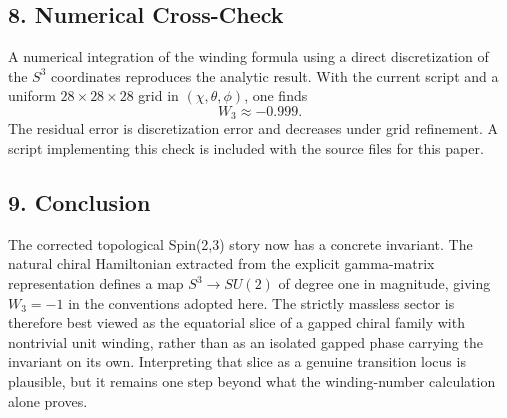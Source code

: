 \documentclass[
]{article}
\begin{document}
\subsection{8. Numerical Cross-Check}\label{numerical-cross-check}

A numerical integration of the winding formula using a direct
discretization of the \(S^3\) coordinates reproduces the analytic
result. With the current script and a uniform \(28 \times 28 \times 28\)
grid in \((\chi,\theta,\phi)\), one finds \[
W_3 \approx -0.999.
\] The residual error is discretization error and decreases under grid
refinement. A script implementing this check is included with the source
files for this paper.

\subsection{9. Conclusion}\label{conclusion}

The corrected topological Spin(2,3) story now has a concrete invariant.
The natural chiral Hamiltonian extracted from the explicit gamma-matrix
representation defines a map \(S^3 \to SU(2)\) of degree one in
magnitude, giving \(W_3 = -1\) in the conventions adopted here. The
strictly massless sector is therefore best viewed as the equatorial
slice of a gapped chiral family with nontrivial unit winding, rather
than as an isolated gapped phase carrying the invariant on its own.
Interpreting that slice as a genuine transition locus is plausible, but
it remains one step beyond what the winding-number calculation alone
proves.
\end{document}
